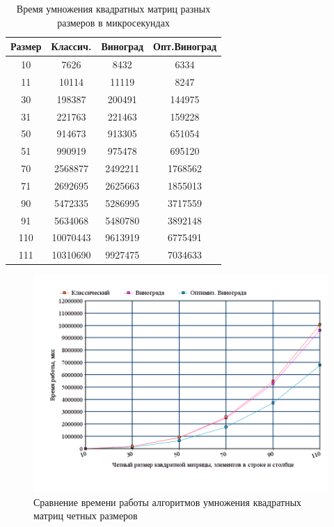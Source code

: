\documentclass[a4paper,oneside,14pt]{extreport}
\begin{document}
\begin{table}[h]
	\begin{center}
		\captionsetup{justification=raggedleft, singlelinecheck=false}
		\caption{\label{time} Время умножения квадратных матриц разных размеров в микросекундах}
		\begin{tabular}{|c c c c|} 
			\hline
			Размер&Классич.&Виноград&Опт.Виноград\\ [0.5ex]
			\hline
			10 &  7626 &  8432 &  6334\\ 
			\hline
			11 &  10114 &  11119 &  8247\\ 
			\hline
			30 &  198387 &  200491 &  144975\\ 
			\hline
			31 &  221763 &  221463 &  159228\\ 
			\hline
			50 &  914673 &  913305 &  651054\\ 
			\hline
			51 &  990919 &  975478 &  695120\\ 
			\hline
			70 &  2568877 &  2492211 &  1768562\\ 
			\hline
			71 &  2692695 &  2625663 &  1855013\\ 
			\hline
			90 &  5472335 &  5286995 &  3717559\\ 
			\hline
			91 &  5634068 &  5480780 &  3892148\\ 
			\hline
			110 &  10070443 &  9613919 &  6775491\\ 
			\hline
			111 &  10310690 &  9927475 &  7034633\\ 
			\hline
		\end{tabular}
	\end{center}
\end{table}

\begin{figure}[H]
	\centering
	\includegraphics[width=1\linewidth]{images/odd_mat}
	\caption{Сравнение времени работы алгоритмов умножения квадратных матриц четных размеров}
	\label{fig:odd_graph}
\end{figure}
\end{document}
